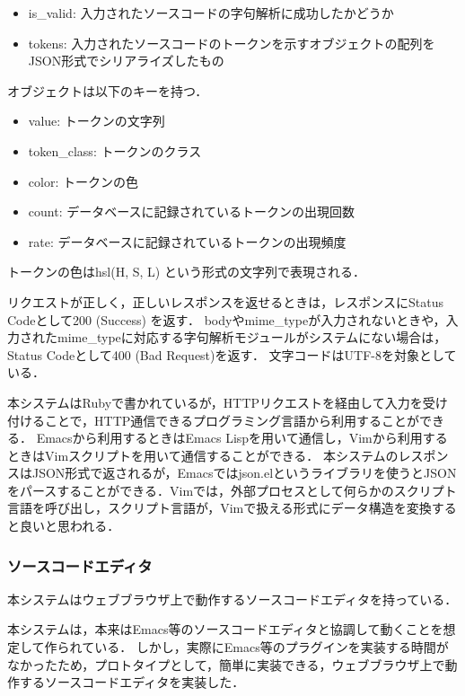 \documentclass{cs-thesis}
\begin{document}
  \begin{itemize}
   \item is\_valid: 入力されたソースコードの字句解析に成功したかどうか
   \item tokens: 入力されたソースコードのトークンを示すオブジェクトの配列をJSON形式でシリアライズしたもの
  \end{itemize}

  オブジェクトは以下のキーを持つ．
  \begin{itemize}
   \item value: トークンの文字列
   \item token\_class: トークンのクラス
   \item color: トークンの色
   \item count: データベースに記録されているトークンの出現回数
   \item rate:  データベースに記録されているトークンの出現頻度
  \end{itemize}

  トークンの色はhsl(H, S, L) という形式の文字列で表現される．

  リクエストが正しく，正しいレスポンスを返せるときは，レスポンスにStatus Codeとして200 (Success) を返す．
  bodyやmime\_typeが入力されないときや，入力されたmime\_typeに対応する字句解析モジュールがシステムにない場合は，Status Codeとして400 (Bad Request)を返す．
  文字コードはUTF-8を対象としている．

  本システムはRubyで書かれているが，HTTPリクエストを経由して入力を受け付けることで，HTTP通信できるプログラミング言語から利用することができる．
  Emacsから利用するときはEmacs Lispを用いて通信し，Vimから利用するときはVimスクリプトを用いて通信することができる．
  本システムのレスポンスはJSON形式で返されるが，Emacsではjson.elというライブラリを使うとJSONをパースすることができる．Vimでは，外部プロセスとして何らかのスクリプト言語を呼び出し，スクリプト言語が，Vimで扱える形式にデータ構造を変換すると良いと思われる．

  \subsubsection{ソースコードエディタ}
  本システムはウェブブラウザ上で動作するソースコードエディタを持っている．

  本システムは，本来はEmacs等のソースコードエディタと協調して動くことを想定して作られている．
  しかし，実際にEmacs等のプラグインを実装する時間がなかったため，プロトタイプとして，簡単に実装できる，ウェブブラウザ上で動作するソースコードエディタを実装した．
\end{document}
